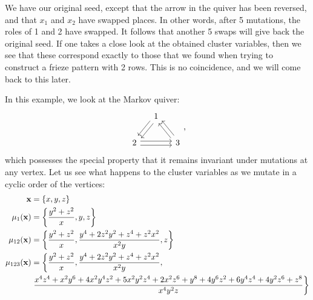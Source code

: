 \begin{example}
	We have our original seed, except that the arrow in the quiver has been reversed, and
	that $x_1$ and $x_2$ have swapped places. In other words, after 5 mutations, the roles
	of 1 and 2 have swapped. It follows that another 5 swaps will give back the original
	seed. If one takes a close look at the obtained cluster variables, then we see that
	these correspond exactly to those that we found when trying to construct a frieze
	pattern with 2 rows. This is no coincidence, and we will come back to this later.
\end{example}
\begin{example}
	In this example, we look at the Markov quiver:
	\begin{equation*}
		\begin{tikzcd}[column sep= small]
			& 1 \ar[ld, shift left] \ar[ld, shift right]\\
			2 \ar[rr, shift left] \ar[rr, shift right] && 3 \ar[lu, shift left] \ar[lu, shift right]
		\end{tikzcd},
	\end{equation*}
	which possesses the special property that it remains invariant under mutations at any
	vertex. Let us see what happens to the cluster variables as we mutate in a cyclic order
	of the vertices:
	\begin{align*}
		\mathbf{x}            & = \{x, y, z\}                                                                                                                                                                               \\
		\mu_1(\mathbf{x})     & = \left\{\frac{y^2 + z^2}{x}, y, z\right\}                                                                                                                                                  \\
		\mu_{12}(\mathbf{x})  & = \left\{\frac{y^2 + z^2}{x}, \frac{y^4 + 2 z^2y^2 +z^4 + z^2x^2 }{x^2y}, z\right\}                                                                                                         \\
		\mu_{123}(\mathbf{x}) & = \left\{\frac{y^2 + z^2}{x}, \frac{y^4 + 2 z^2y^2 +z^4 + z^2x^2 }{x^2y},\right.                                                                                                            \\
		               & \left. \frac{x^{4} z^{4} + x^{2} y^{6} + 4 x^{2} y^{4} z^{2} + 5 x^{2} y^{2} z^{4} + 2 x^{2} z^{6} + y^{8} + 4 y^{6} z^{2} + 6 y^{4} z^{4} + 4 y^{2} z^{6} + z^{8}}{x^{4} y^{2} z} \right\}
	\end{align*}

\end{example}
